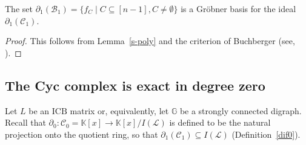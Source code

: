 \documentclass[ALCO]{cedram}
\newcommand{\mbk}{\mbox{$\mathbb{K}$}}
\newcommand{\mbg}{\mbox{$\mathbb{G}$}}
\newcommand{\mcb}{\mbox{$\mathcal{B}$}}
\newcommand{\mcc}{\mbox{$\mathcal{C}$}}
\newcommand{\mcl}{\mbox{$\mathcal{L}$}}
\newcommand{\icb}{\mbox{$\mathrm{ICB}$}}
\newcommand{\dif}{\mbox{$\partial$}}
\begin{document}
\begin{proposition}\label{GB1}
The set $\dif_1(\mcb_1)=\{f_C\mid C\subseteq [n-1],
C\neq\emptyset\}$ is a Gr\"obner basis for the ideal
$\dif_1(\mcc_1)$.
\end{proposition}
\begin{proof}
This follows from Lemma~\ref{s-poly} and the criterion of Buchberger
(see, \eg \cite[\S~2.6, Theorem~6 and \S~2.9, Theorem~3]{clo}).
\end{proof}

\subsection{The Cyc complex is exact in degree zero}\label{exact-degree0}

 Let $L$ be an $\icb$ matrix or, equivalently, let $\mbg$ be
a strongly connected digraph.  Recall that $\dif_0:\mcc_0=\mbk[x]\to
\mbk[x]/I(\mcl)$ is defined to be the natural projection onto the
quotient ring, so that $\dif_1(\mcc_1)\subseteq I(\mcl)$
(Definition~\ref{dif0}).
\end{document}
